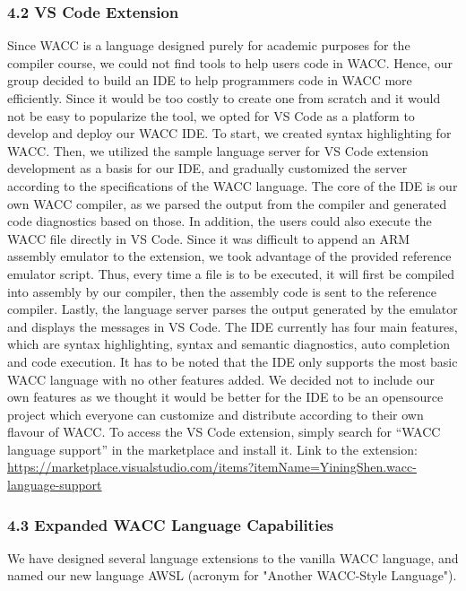 \documentclass[10pt,a4paper]{report}
\begin{document}
  \subsubsection*{4.2 VS Code Extension}
  Since WACC is a language designed purely for academic purposes for the
  compiler course, we could not find tools to help users code in WACC. Hence,
  our group decided to build an IDE to help programmers code in WACC more
  efficiently. Since it would be too costly to create one from scratch and it
  would not be easy to popularize the tool, we opted for VS Code as a platform 
  to develop and deploy our WACC IDE. To start, we created syntax highlighting
  for WACC. Then, we utilized the sample language server for VS Code extension
  development as a basis for our IDE, and gradually customized the server
  according to the specifications of the WACC language. The core of the IDE is
  our own WACC compiler, as we parsed the output from the compiler and generated
  code diagnostics based on those. In addition, the users could also execute the
  WACC file directly in VS Code. Since it was difficult to append an ARM
  assembly emulator to the extension, we took advantage of the provided
  reference emulator script. Thus, every time a file is to be executed, it will
  first be compiled into assembly by our compiler, then the assembly code is
  sent to the reference compiler. Lastly, the language server parses the output
  generated by the emulator and displays the messages in VS Code. The IDE
  currently has four main features, which are syntax highlighting, syntax and
  semantic diagnostics, auto completion and code execution. It has to be noted
  that the IDE only supports the most basic WACC language with no other features
  added. We decided not to include our own features as we thought it would be
  better for the IDE to be an opensource project which everyone can customize
  and distribute according to their own flavour of WACC. To access the VS Code
  extension, simply search for “WACC language support” in the marketplace and
  install it.
  Link to the extension: 
  \url{https://marketplace.visualstudio.com/items?itemName=YiningShen.wacc-language-support}

  \subsubsection*{4.3 Expanded WACC Language Capabilities}
  We have designed several language extensions to the vanilla WACC language, and
  named our new language AWSL (acronym for "Another WACC-Style Language").
\end{document}
